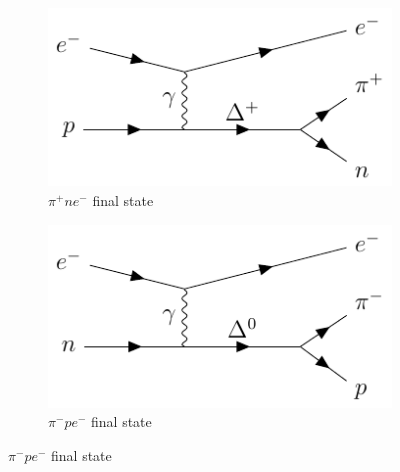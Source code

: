 \documentclass[a4paper,12pt]{article}
\begin{document}
\begin{figure}[H]
    \centering
    \begin{subfigure}[b]{0.45\textwidth}
        \centering
        \includegraphics{figures/fds/RESel1.pdf}
        \caption{
            $\pi^+ne^-$ final state
        }
    \end{subfigure}
    \begin{subfigure}[b]{0.45\textwidth}
        \centering
        \includegraphics{figures/fds/RESel2.pdf}
        \caption{
            $\pi^-pe^-$ final state
        }
    \end{subfigure}


\end{figure}
\end{document}
